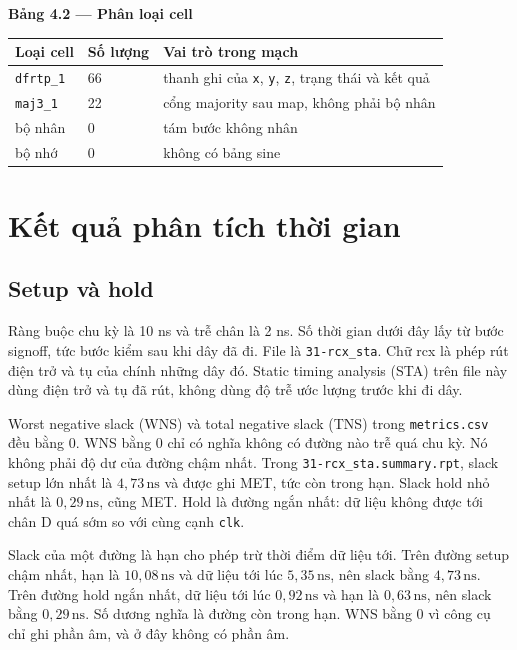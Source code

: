 \documentclass[12pt,a4paper]{article}
\begin{document}
\noindent\textbf{Bảng 4.2 — Phân loại cell}

\begin{tabularx}{\textwidth}{|Y|Y|Y|}
\hline
Loại cell & Số lượng & Vai trò trong mạch \\ \hline
\texttt{dfrtp\_1} & 66 & thanh ghi của \texttt{x}, \texttt{y}, \texttt{z}, trạng thái và kết quả \\ \hline
\texttt{maj3\_1} & 22 & cổng majority sau map, không phải bộ nhân \\ \hline
bộ nhân & 0 & tám bước không nhân \\ \hline
bộ nhớ & 0 & không có bảng sine \\ \hline
\end{tabularx}

\section{Kết quả phân tích thời gian}

\subsection{Setup và hold}

Ràng buộc chu kỳ là 10 ns và trễ chân là 2 ns. Số thời gian dưới đây lấy từ bước signoff, tức bước kiểm sau khi dây đã đi. File là \texttt{31-rcx\_sta}. Chữ rcx là phép rút điện trở và tụ của chính những dây đó. Static timing analysis (STA) trên file này dùng điện trở và tụ đã rút, không dùng độ trễ ước lượng trước khi đi dây.

Worst negative slack (WNS) và total negative slack (TNS) trong \texttt{metrics.csv} đều bằng 0. WNS bằng 0 chỉ có nghĩa không có đường nào trễ quá chu kỳ. Nó không phải độ dư của đường chậm nhất. Trong \texttt{31-rcx\_sta.summary.rpt}, slack setup lớn nhất là \(4{,}73\,\mathrm{ns}\) và được ghi MET, tức còn trong hạn. Slack hold nhỏ nhất là \(0{,}29\,\mathrm{ns}\), cũng MET. Hold là đường ngắn nhất: dữ liệu không được tới chân D quá sớm so với cùng cạnh \texttt{clk}.

Slack của một đường là hạn cho phép trừ thời điểm dữ liệu tới. Trên đường setup chậm nhất, hạn là \(10{,}08\,\mathrm{ns}\) và dữ liệu tới lúc \(5{,}35\,\mathrm{ns}\), nên slack bằng \(4{,}73\,\mathrm{ns}\). Trên đường hold ngắn nhất, dữ liệu tới lúc \(0{,}92\,\mathrm{ns}\) và hạn là \(0{,}63\,\mathrm{ns}\), nên slack bằng \(0{,}29\,\mathrm{ns}\). Số dương nghĩa là đường còn trong hạn. WNS bằng 0 vì công cụ chỉ ghi phần âm, và ở đây không có phần âm.
\end{document}
